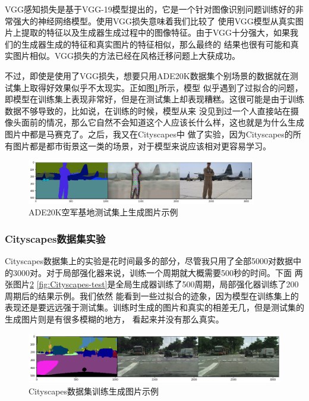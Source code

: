 \documentclass[supercite]{HustGraduPaper}
\theoremstyle{definition}
\begin{document}
VGG感知损失是基于VGG-19模型\cite{articleVGG}提出的，它是一个针对图像识别问题训练好的非常强大的神经网络模型。使用VGG损失意味着我们比较了
使用VGG模型从真实图片上提取的特征以及生成器生成过程中的图像特征。由于VGG十分强大，如果我们的生成器生成的特征和真实图片的特征相似，那么最终的
结果也很有可能和真实图片相似。VGG损失的方法已经在风格迁移\cite{DBLP:journals/corr/JohnsonAL16}问题上大获成功。

不过，即使是使用了VGG损失，想要只用ADE20K数据集个别场景的数据就在测试集上取得好效果似乎不太现实。正如图\ref{fig:ADE20K-test}所示，模型
似乎遇到了过拟合的问题，即模型在训练集上表现非常好，但是在测试集上却表现糟糕。这很可能是由于训练数据不够导致的，比如说，在训练的时候，模型从来
没见到过一个人直接站在摄像头面前的情况，那么它自然不会知道这个人应该长什么样，这也就是为什么生成图片中都是马赛克了。之后，我又在Cityscapes中
做了实验，因为Cityscapes的所有图片都是都市街景这一类的场景，对于模型来说应该相对更容易学习。
\begin{figure}[H]
  \begin{center}
  \includegraphics[width=10cm]{images/ade20k-test}
  \end{center}
  \caption{ADE20K空军基地测试集上生成图片示例}
  \label{fig:ADE20K-test}
\end{figure}

\subsubsection{Cityscapes数据集实验}

Cityscapes数据集上的实验是花时间最多的部分，尽管我只用了全部5000对数据中的3000对。对于局部强化器来说，训练一个周期就大概需要500秒的时间。下面
两张图片\ref{fig:Cityscapes-train} \ref{fig:Cityscapes-test}是全局生成器训练了500周期，局部强化器训练了200周期后的结果示例。我们依然
能看到一些过拟合的迹象，因为模型在训练集上的表现还是要远远强于测试集。训练时生成的图片和真实的相差无几，但是测试集的生成图片则是有很多模糊的地方，
看起来并没有那么真实。
\begin{figure}[H]
  \begin{center}
  \includegraphics[width=14cm]{images/cityscapes-train}
  \end{center}
  \caption{Cityscapes数据集训练生成图片示例}
  \label{fig:Cityscapes-train}
\end{figure}
\end{document}
